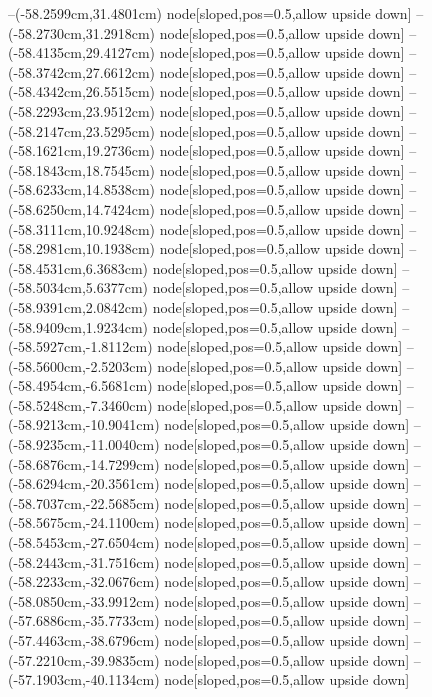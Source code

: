 --(-58.2599cm,31.4801cm) node[sloped,pos=0.5,allow upside down]{\ArrowIn}
--(-58.2730cm,31.2918cm) node[sloped,pos=0.5,allow upside down]{\arrowIn}
--(-58.4135cm,29.4127cm) node[sloped,pos=0.5,allow upside down]{\ArrowIn}
--(-58.3742cm,27.6612cm) node[sloped,pos=0.5,allow upside down]{\ArrowIn}
--(-58.4342cm,26.5515cm) node[sloped,pos=0.5,allow upside down]{\ArrowIn}
--(-58.2293cm,23.9512cm) node[sloped,pos=0.5,allow upside down]{\ArrowIn}
--(-58.2147cm,23.5295cm) node[sloped,pos=0.5,allow upside down]{\arrowIn}
--(-58.1621cm,19.2736cm) node[sloped,pos=0.5,allow upside down]{\ArrowIn}
--(-58.1843cm,18.7545cm) node[sloped,pos=0.5,allow upside down]{\arrowIn}
--(-58.6233cm,14.8538cm) node[sloped,pos=0.5,allow upside down]{\ArrowIn}
--(-58.6250cm,14.7424cm) node[sloped,pos=0.5,allow upside down]{\arrowIn}
--(-58.3111cm,10.9248cm) node[sloped,pos=0.5,allow upside down]{\ArrowIn}
--(-58.2981cm,10.1938cm) node[sloped,pos=0.5,allow upside down]{\arrowIn}
--(-58.4531cm,6.3683cm) node[sloped,pos=0.5,allow upside down]{\ArrowIn}
--(-58.5034cm,5.6377cm) node[sloped,pos=0.5,allow upside down]{\arrowIn}
--(-58.9391cm,2.0842cm) node[sloped,pos=0.5,allow upside down]{\ArrowIn}
--(-58.9409cm,1.9234cm) node[sloped,pos=0.5,allow upside down]{\arrowIn}
--(-58.5927cm,-1.8112cm) node[sloped,pos=0.5,allow upside down]{\ArrowIn}
--(-58.5600cm,-2.5203cm) node[sloped,pos=0.5,allow upside down]{\arrowIn}
--(-58.4954cm,-6.5681cm) node[sloped,pos=0.5,allow upside down]{\ArrowIn}
--(-58.5248cm,-7.3460cm) node[sloped,pos=0.5,allow upside down]{\arrowIn}
--(-58.9213cm,-10.9041cm) node[sloped,pos=0.5,allow upside down]{\ArrowIn}
--(-58.9235cm,-11.0040cm) node[sloped,pos=0.5,allow upside down]{\arrowIn}
--(-58.6876cm,-14.7299cm) node[sloped,pos=0.5,allow upside down]{\ArrowIn}
--(-58.6294cm,-20.3561cm) node[sloped,pos=0.5,allow upside down]{\ArrowIn}
--(-58.7037cm,-22.5685cm) node[sloped,pos=0.5,allow upside down]{\ArrowIn}
--(-58.5675cm,-24.1100cm) node[sloped,pos=0.5,allow upside down]{\ArrowIn}
--(-58.5453cm,-27.6504cm) node[sloped,pos=0.5,allow upside down]{\ArrowIn}
--(-58.2443cm,-31.7516cm) node[sloped,pos=0.5,allow upside down]{\ArrowIn}
--(-58.2233cm,-32.0676cm) node[sloped,pos=0.5,allow upside down]{\arrowIn}
--(-58.0850cm,-33.9912cm) node[sloped,pos=0.5,allow upside down]{\ArrowIn}
--(-57.6886cm,-35.7733cm) node[sloped,pos=0.5,allow upside down]{\ArrowIn}
--(-57.4463cm,-38.6796cm) node[sloped,pos=0.5,allow upside down]{\ArrowIn}
--(-57.2210cm,-39.9835cm) node[sloped,pos=0.5,allow upside down]{\ArrowIn}
--(-57.1903cm,-40.1134cm) node[sloped,pos=0.5,allow upside down]{\arrowIn}
